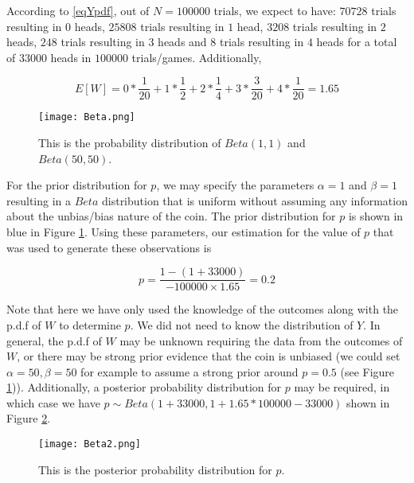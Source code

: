 \documentclass{article}
\begin{document}
\begin{flushleft}
According to \ref{eqYpdf}, out of $N=100000$ trials, we expect to have: $70728$ trials resulting in $0$ heads, $25808$ trials resulting in $1$ head, $3208$ trials resulting in $2$ heads, $248$ trials resulting in $3$ heads and $8$ trials resulting in $4$ heads for a total of $33000$ heads in $100000$ trials/games. Additionally, 

$$E[W] = 0*\frac{1}{20} + 1*\frac{1}{2} + 2*\frac{1}{4} + 3*\frac{3}{20} + 4*\frac{1}{20}=1.65$$

\begin{figure}
    \centering
    \texttt{[image: Beta.png]}
    \caption{This is the probability distribution of $Beta(1,1)$ and $Beta(50,50)$.}
    \label{fig:Beta}
\end{figure}

For the prior distribution for $p$, we may specify the parameters $\alpha=1$ and $\beta=1$ resulting in a $Beta$ distribution that is uniform without assuming any information about the unbias/bias nature of the coin. The prior distribution for $p$ is shown in blue in Figure \ref{fig:Beta}. Using these parameters, our estimation for the value of $p$ that was used to generate these observations is

$$p = \frac{1-(1+33000)}{-100000 \times 1.65} = 0.2$$

Note that here we have only used the knowledge of the outcomes along with the p.d.f of $W$ to determine $p$. We did not need to know the distribution of $Y$. In general, the p.d.f of $W$ may be unknown requiring the data from the outcomes of $W$, or there may be strong prior evidence that the coin is unbiased (we could set $\alpha = 50,\beta = 50$ for example to assume a strong prior around $p=0.5$ (see Figure \ref{fig:Beta})). Additionally, a posterior probability distribution for $p$ may be required, in which case we have $p \sim Beta(1+33000,1+1.65*100000-33000)$ shown in Figure \ref{fig:Beta2}.

\begin{figure}
    \centering
    \texttt{[image: Beta2.png]}
    \caption{This is the posterior probability distribution for $p$.}
    \label{fig:Beta2}
\end{figure}

\end{flushleft}
\end{document}

